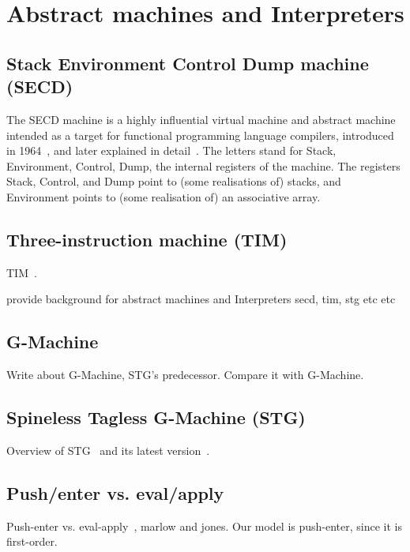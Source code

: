 \documentclass[diploma]{softlab-thesis}
\begin{document}
\section{Abstract machines and Interpreters}
\label{sec:abstract-machines}

\subsection {Stack Environment Control Dump machine (SECD)}
\label{sec:secd}

The SECD machine is a highly influential virtual machine and abstract 
machine intended as a target for functional programming 
language compilers, introduced in 1964~\cite{La64}, and later explained
in detail~\cite{Danvy:2004:RDL:2154439.2154443}. The letters stand for Stack, Environment, 
Control, Dump, the internal registers of the machine. 
The registers Stack, Control, and Dump point to (some 
realisations of) stacks, and Environment points to (some 
realisation of) an associative array.

\subsection{Three-instruction machine (TIM)}
\label{sec:tim}

TIM~\cite{Argo89}.

provide background for abstract machines and Interpreters
secd, tim, stg etc etc

\subsection{G-Machine}
\label{sec:g-machine}
Write about G-Machine, STG's predecessor. Compare it with G-Machine.

\subsection{Spineless Tagless G-Machine (STG)}
\label{sec:stg}
Overview of STG~\cite{Jo92} and its latest version~\cite{Ma06}.

\subsection{Push/enter vs. eval/apply}
\label{sec:push-enter}
Push-enter vs. eval-apply~\cite{Ma06}, marlow and jones. Our model is push-enter, since it is first-order.

\end{document}

